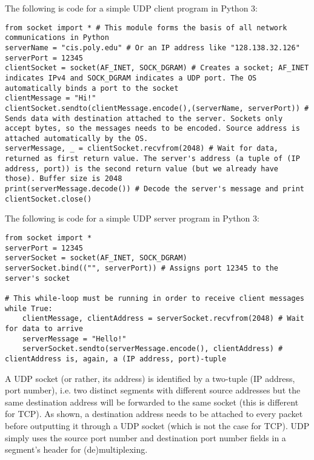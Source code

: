 \documentclass[8pt, table, xcdraw]{article}%
\begin{document}
The following is code for a simple UDP client program in Python 3:

\begin{lstlisting}
from socket import * # This module forms the basis of all network communications in Python
serverName = "cis.poly.edu" # Or an IP address like "128.138.32.126"
serverPort = 12345
clientSocket = socket(AF_INET, SOCK_DGRAM) # Creates a socket; AF_INET indicates IPv4 and SOCK_DGRAM indicates a UDP port. The OS automatically binds a port to the socket
clientMessage = "Hi!"
clientSocket.sendto(clientMessage.encode(),(serverName, serverPort)) # Sends data with destination attached to the server. Sockets only accept bytes, so the messages needs to be encoded. Source address is attached automatically by the OS.
serverMessage, _ = clientSocket.recvfrom(2048) # Wait for data, returned as first return value. The server's address (a tuple of (IP address, port)) is the second return value (but we already have those). Buffer size is 2048
print(serverMessage.decode()) # Decode the server's message and print
clientSocket.close()
\end{lstlisting}

The following is code for a simple UDP server program in Python 3:

\begin{lstlisting}
from socket import *
serverPort = 12345
serverSocket = socket(AF_INET, SOCK_DGRAM)
serverSocket.bind(("", serverPort)) # Assigns port 12345 to the server's socket

# This while-loop must be running in order to receive client messages
while True:
    clientMessage, clientAddress = serverSocket.recvfrom(2048) # Wait for data to arrive
    serverMessage = "Hello!"
    serverSocket.sendto(serverMessage.encode(), clientAddress) # clientAddress is, again, a (IP address, port)-tuple
\end{lstlisting}

A UDP socket (or rather, its address) is identified by a two-tuple (IP address, port number), i.e. two distinct segments with different source addresses but the same destination address will be forwarded to the same socket (this is different for TCP). As shown, a destination address needs to be attached to every packet before outputting it through a UDP socket (which is not the case for TCP). UDP simply uses the source port number and destination port number fields in a segment's header for (de)multiplexing.
\end{document}
